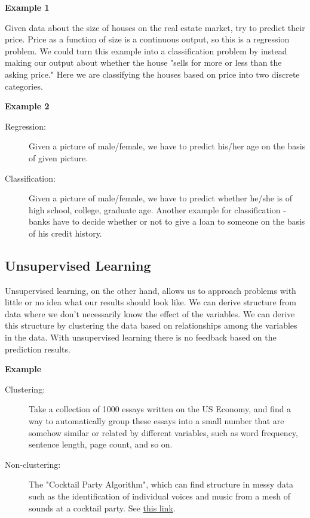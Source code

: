 \documentclass[a4paper,11pt]{report}
\begin{document}
\textbf{Example 1}

Given data about the size of houses on the real estate market, try to predict their price. Price as a function of size is a continuous output, so this is a regression problem.
We could turn this example into a classification problem by instead making our output about whether the house "sells for more or less than the asking price." Here we are classifying the houses based on price into two discrete categories.

\newpage

\textbf{Example 2}
\begin{description}
 \item [Regression:] Given a picture of male/female, we have to predict his/her age on the basis of given picture.
 \item [Classification:] Given a picture of male/female, we have to predict whether he/she is of high school, college, graduate age. Another example for classification - banks have to decide whether or not to give a loan to someone on the basis of his credit history.
\end{description}

\subsection*{Unsupervised Learning}

Unsupervised learning, on the other hand, allows us to approach problems with little or no idea what our results should look like. We can derive structure from data where we don't necessarily know the effect of the variables. We can derive this structure by clustering the data based on relationships among the variables in the data. With unsupervised learning there is no feedback based on the prediction results.

\textbf{Example}
\begin{description}
\item[Clustering:] Take a collection of 1000 essays written on the US Economy, and find a way to automatically group these essays into a small number that are somehow similar or related by different variables, such as word frequency, sentence length, page count, and so on.
\item[Non-clustering:] The "Cocktail Party Algorithm", which can find structure in messy data such as the identification of individual voices and music from a mesh of sounds at a cocktail party. See \href{https://en.wikipedia.org/wiki/Cocktail_party_effect}{this link}.
\end{description}
\end{document}
